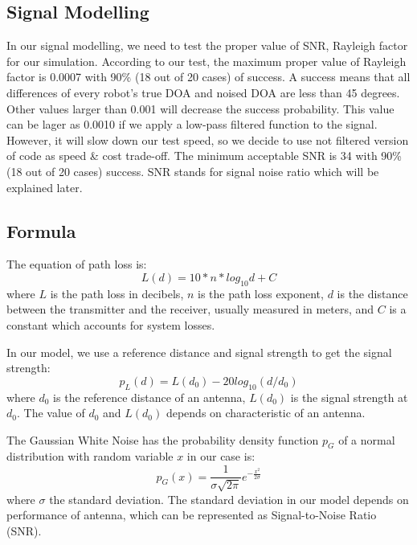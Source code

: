 \subsection{Signal Modelling}
\par
In our signal modelling, we need to test the proper value of SNR, Rayleigh factor for our simulation. According to our test, the maximum proper value of Rayleigh factor is 0.0007 with 90\% (18 out of 20 cases) of success. A success means that all differences of every robot's true DOA and noised DOA are less than 45 degrees. Other values larger than 0.001 will decrease the success probability. This value can be lager as 0.0010 if we apply a low-pass filtered function to the signal. However, it will slow down our test speed, so we decide to use not filtered version of code as speed & cost trade-off. The minimum acceptable SNR is 34 with 90\%(18 out of 20 cases) success. SNR stands for signal noise ratio which will be explained later.
\\

\subsection{Formula}
The equation of path loss is:
\begin{equation}
L(d)=10*n*log_{10}d + C
\end{equation}
where $L$ is the path loss in decibels, $n$ is the path loss exponent, $d$ is the distance between the transmitter and the receiver, usually measured in meters, and $C$ is a constant which accounts for system losses.
\par
In our model, we use a reference distance and signal strength to get the signal strength:
\begin{equation}
p_{L}(d)=L(d_{0})-20log_{10}(d/d_{0})
\end{equation}
where $d_{0}$ is the reference distance of an antenna, $L(d_{0})$ is the signal strength at $d_{0}$. The value of $d_{0}$ and $L(d_{0})$ depends on characteristic of an antenna.
\\
\vspace{1cm}

The Gaussian White Noise has the probability density function $p_{G}$ of a normal distribution with random variable $x$ in our case is:
\begin{equation}
p_{G}(x)={\frac {1}{ {\sigma\sqrt {2\pi }}}}e^{-{\frac {x^{2}}{2\sigma}}}
\end{equation}
where $\sigma$  the standard deviation. The standard deviation in our model depends on performance of antenna, which can be represented as Signal-to-Noise Ratio (SNR).
\vspace{1cm}

